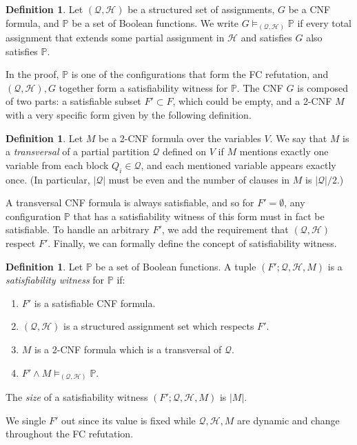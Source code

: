 \documentclass[11pt]{article}
\numberwithin{equation}{section}
\theoremstyle{definition}
\newtheorem{definition}[theorem]{Definition}
\theoremstyle{plain}
\theoremstyle{plain}
\theoremstyle{definition}
\newcommand{\setsize}[1]{\lvert#1\rvert}
\newcommand{\introduceterm}[1]{{\emph{#1}}}
\newcommand{\polynomialsetformat}[1]{\mathbb{#1}}
\newcommand{\pcsp}{\polynomialsetformat{P}}
\newcommand{\BGmodels}[2]{\models_{(#1,#2)}}
\newcommand{\partialmodels}{\BGmodels{\partitionnot}{\assignmentsetnot}}
\newcommand{\satwitness}[1][]{(F';\partitionnot #1, \assignmentsetnot #1, M #1)}
\newcommand{\partitionnot}{\mathcal{Q}}
\newcommand{\assignmentsetnot}{\mathcal{H}}
\newcommand{\structuredassignmentsnot}[1][]{(\partitionnot #1,\assignmentsetnot #1)}
\begin{document}
\begin{definition}
  \label{def:partialmodels}
  Let $\structuredassignmentsnot$ be a structured set of assignments, $G$ be a
  CNF formula, and $\pcsp$ be a set of Boolean functions.
  We write $G \partialmodels \pcsp$ if every total assignment that extends some partial assignment in $\assignmentsetnot$ and satisfies $G$ also satisfies $\pcsp$.
\end{definition}

In the proof, $\pcsp$ is one of the configurations that form the FC refutation, and $\structuredassignmentsnot,G$ together form a satisfiability witness for $\pcsp$. The CNF $G$ is composed of two parts: a satisfiable subset $F' \subset F$, which could be empty, and a 2-CNF $M$ with a very specific form given by the following definition.

\begin{definition}
  \label{def:transversal}
  Let $M$ be a 2-CNF formula over the variables $V$. We say that $M$ is a \introduceterm{transversal} of a partial partition $\partitionnot$ defined on $V$ if $M$ mentions exactly one variable from each block $Q_i \in \partitionnot$, and each mentioned variable appears exactly once. (In particular, $\setsize{\partitionnot}$ must be even and the number of clauses in $M$ is $\setsize{\partitionnot}/2$.)
\end{definition}

A transversal CNF formula is always satisfiable, and so for $F' = \emptyset$, any configuration $\pcsp$ that has a satisfiability witness of this form must in fact be satisfiable. To handle an arbitrary $F'$, we add the requirement that $\structuredassignmentsnot$ respect $F'$. Finally, we can formally define the concept of satisfiability witness.
%

\begin{definition}
 \label{def:witness}
 Let $\pcsp$ be a set of Boolean functions. A tuple $\satwitness$ is a \introduceterm{satisfiability witness} for $\pcsp$ if:
\begin{enumerate}
 \item $F'$ is a satisfiable CNF formula.
 \item $\structuredassignmentsnot$ is a structured assignment set which respects $F'$.
 \item $M$ is a 2-CNF formula which is a transversal of $\partitionnot$.
 \item $F'\land M \partialmodels \pcsp$.
\end{enumerate}
 The \emph{size} of a satisfiability witness $\satwitness$ is $\setsize{M}$.
\end{definition}
We single $F'$ out since its value is fixed while $\partitionnot,\assignmentsetnot,M$ are dynamic and change throughout the FC refutation.
\end{document}
